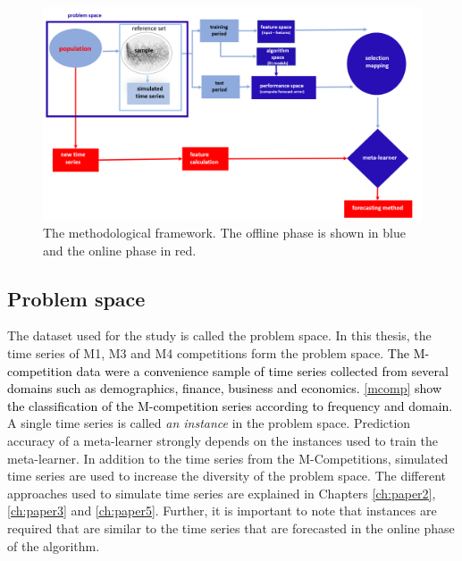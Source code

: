 \documentclass{monashthesis}
\begin{document}
\begin{figure}[h]

{\centering \includegraphics[width=1.05\linewidth,height=0.4\textheight]{chap1metalearning} 

}

\caption{The methodological framework. The offline phase is shown in blue and the online phase in red.}\label{fig:frameworkch1}
\end{figure}

\hypertarget{problem-space}{%
\subsection{Problem space}\label{problem-space}}

The dataset used for the study is called the problem space. In this thesis, the time series of M1, M3 \autocite{makridakis2000m3} and M4 competitions \autocite{makridakis2018m4} form the problem space. \textcolor{black}{The M-competition data were a convenience sample of time series collected from several domains such as demographics, finance, business and economics.} \autoref{mcomp} \textcolor{black}{show the classification of the M-competition series according to frequency and domain.} A single time series is called \emph{an instance} in the problem space. Prediction accuracy of a meta-learner strongly depends on the instances used to train the meta-learner. In addition to the time series from the M-Competitions, simulated time series are used to increase the diversity of the problem space. The different approaches used to simulate time series are explained in Chapters \ref{ch:paper2}, \ref{ch:paper3} and \ref{ch:paper5}. Further, it is important to note that instances are required that are similar to the time series that are forecasted in the online phase of the algorithm.
\end{document}
